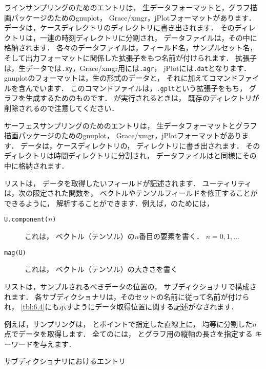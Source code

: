 ラインサンプリングのためのエントリは，
生データフォーマットと，グラフ描画パッケージのためのgnuplot，
Grace/xmgr，jPlotフォーマットがあります．
データは，ケースディレクトリのディレクトリに書き出されます．
そのディレクトリは，一連の時刻ディレクトリに分割され，
データファイルは，その中に格納されます．
各々のデータファイルは，フィールド名，サンプルセット名，
そして出力フォーマットに関係した拡張子をもつ名前が付けられます．
拡張子は，生データでは\texttt{.xy}，Grace/xmgr用には\texttt{.agr}，
jPlotには\texttt{.dat}となります．
gnuplotのフォーマットは，生の形式のデータと，
それに加えてコマンドファイルを含んでいます．
このコマンドファイルは，\texttt{.gplt}という拡張子をもち，
グラフを生成するためのものです．
が実行されるときは，
既存のディレクトリが削除されるので注意してください．

サーフェスサンプリングのためのエントリは，
生データフォーマットとグラフ描画パッケージのためのgnuplot，
Grace/xmgr，jPlotフォーマットがあります．
データは，ケースディレクトリの，
ディレクトリに書き出されます．
そのディレクトリは時間ディレクトリに分割され，
データファイルはと同様にその中に格納されます．

リストは，
データを取得したいフィールドが記述されます．
ユーティリティは，次の限定された関数を，
ベクトルやテンソルフィールドを修正することができるように，
解析することができます．例えば，のためには，
\begin{description}
 \item[\texttt{U.component($n$)}] これは，
            ベクトル（テンソル）の$n$番目の要素を書く．
            $n = 0, 1, \ldots$
 \item[\texttt{mag(U)}] これは，
            ベクトル（テンソル）の大きさを書く
\end{description}
リストは，サンプルされるべきデータの位置の，
サブディクショナリで構成されます．
各サブディクショナリは，そのセットの名前に従って名前が付けられ，
\autoref{tbl:6.4}にも示すようにデータ取得位置に関する記述がなされます．

例えば，サンプリングは，
とポイントで指定した直線上に，
均等に分割した$n$点でデータを取得します．
全てのには，
とグラフ用の縦軸の長さを指定する
キーワードを与えます．


\begin{table}[ht]
 
 \caption{サブディクショナリにおけるエントリ}
 \label{tbl:6.4}
\end{table}


